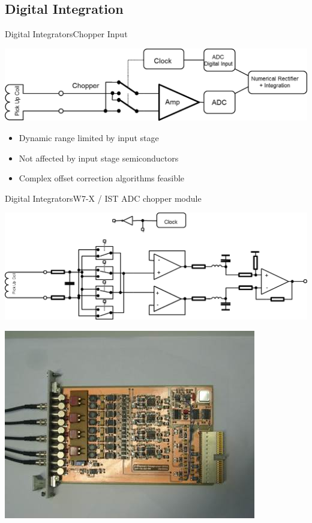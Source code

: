 \documentclass{beamer}
\begin{document}
\subsection{Digital Integration}
\begin{frame}{Digital Integrators}{Chopper Input}
	\begin{center}
		\includegraphics[width=0.8\columnwidth]{chopperInt.png}
	\end{center}
	\begin{itemize}
		\item Dynamic range limited by input stage
		\item Not affected by input stage semiconductors
		\item Complex offset correction algorithms feasible
 	\end{itemize}
%
%
\end{frame}

\begin{frame}{Digital Integrators}{W7-X / IST ADC chopper module}
	\begin{center}
		\includegraphics[width=0.7\columnwidth]{w7xSchema.png}

		\includegraphics[height = 3 cm]{w7xInt.jpg}
	\end{center}
\end{frame}
\end{document}
